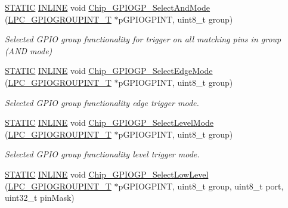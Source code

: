 \begin{DoxyCompactItemize}
\hyperlink{group___l_p_c___types___public___macros_ga10b2d890d871e1489bb02b7e70d9bdfb}{S\+T\+A\+T\+IC} \hyperlink{spifi__18xx__43xx_8h_a2eb6f9e0395b47b8d5e3eeae4fe0c116}{I\+N\+L\+I\+NE} void \hyperlink{group___g_p_i_o_g_p__18_x_x__43_x_x_gab829f4b04c6e3359b7ed5ce18f3a57a0}{Chip\+\_\+\+G\+P\+I\+O\+G\+P\+\_\+\+Select\+And\+Mode} (\hyperlink{struct_l_p_c___g_p_i_o_g_r_o_u_p_i_n_t___t}{L\+P\+C\+\_\+\+G\+P\+I\+O\+G\+R\+O\+U\+P\+I\+N\+T\+\_\+T} $\ast$p\+G\+P\+I\+O\+G\+P\+I\+NT, uint8\+\_\+t group)
\begin{DoxyCompactList}\small\item\em Selected G\+P\+IO group functionality for trigger on all matching pins in group (A\+ND mode) \end{DoxyCompactList}\item 
\hyperlink{group___l_p_c___types___public___macros_ga10b2d890d871e1489bb02b7e70d9bdfb}{S\+T\+A\+T\+IC} \hyperlink{spifi__18xx__43xx_8h_a2eb6f9e0395b47b8d5e3eeae4fe0c116}{I\+N\+L\+I\+NE} void \hyperlink{group___g_p_i_o_g_p__18_x_x__43_x_x_ga996008a6e3c8855e718f4be1964bcf95}{Chip\+\_\+\+G\+P\+I\+O\+G\+P\+\_\+\+Select\+Edge\+Mode} (\hyperlink{struct_l_p_c___g_p_i_o_g_r_o_u_p_i_n_t___t}{L\+P\+C\+\_\+\+G\+P\+I\+O\+G\+R\+O\+U\+P\+I\+N\+T\+\_\+T} $\ast$p\+G\+P\+I\+O\+G\+P\+I\+NT, uint8\+\_\+t group)
\begin{DoxyCompactList}\small\item\em Selected G\+P\+IO group functionality edge trigger mode. \end{DoxyCompactList}\item 
\hyperlink{group___l_p_c___types___public___macros_ga10b2d890d871e1489bb02b7e70d9bdfb}{S\+T\+A\+T\+IC} \hyperlink{spifi__18xx__43xx_8h_a2eb6f9e0395b47b8d5e3eeae4fe0c116}{I\+N\+L\+I\+NE} void \hyperlink{group___g_p_i_o_g_p__18_x_x__43_x_x_ga89fb32921cee3e7f32d13eb039f211a4}{Chip\+\_\+\+G\+P\+I\+O\+G\+P\+\_\+\+Select\+Level\+Mode} (\hyperlink{struct_l_p_c___g_p_i_o_g_r_o_u_p_i_n_t___t}{L\+P\+C\+\_\+\+G\+P\+I\+O\+G\+R\+O\+U\+P\+I\+N\+T\+\_\+T} $\ast$p\+G\+P\+I\+O\+G\+P\+I\+NT, uint8\+\_\+t group)
\begin{DoxyCompactList}\small\item\em Selected G\+P\+IO group functionality level trigger mode. \end{DoxyCompactList}\item 
\hyperlink{group___l_p_c___types___public___macros_ga10b2d890d871e1489bb02b7e70d9bdfb}{S\+T\+A\+T\+IC} \hyperlink{spifi__18xx__43xx_8h_a2eb6f9e0395b47b8d5e3eeae4fe0c116}{I\+N\+L\+I\+NE} void \hyperlink{group___g_p_i_o_g_p__18_x_x__43_x_x_ga230ad2c0745d1be272cbea3ac83a5925}{Chip\+\_\+\+G\+P\+I\+O\+G\+P\+\_\+\+Select\+Low\+Level} (\hyperlink{struct_l_p_c___g_p_i_o_g_r_o_u_p_i_n_t___t}{L\+P\+C\+\_\+\+G\+P\+I\+O\+G\+R\+O\+U\+P\+I\+N\+T\+\_\+T} $\ast$p\+G\+P\+I\+O\+G\+P\+I\+NT, uint8\+\_\+t group, uint8\+\_\+t port, uint32\+\_\+t pin\+Mask)

\end{DoxyCompactItemize}

